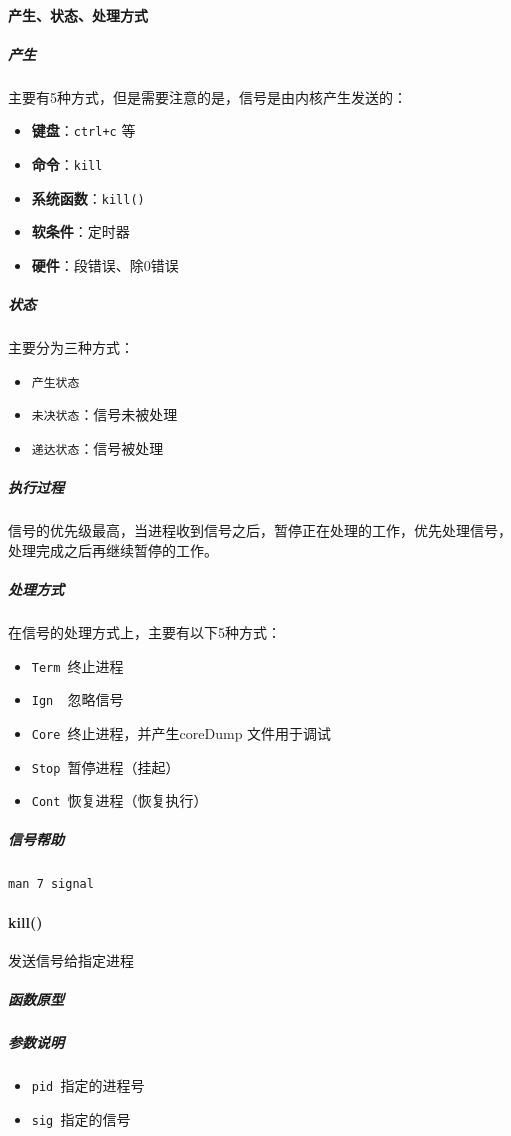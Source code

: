 \documentclass[UTF8,a4paper,12pt]{ctexbook}
\begin{document}
		\paragraph{产生、状态、处理方式}
			\subparagraph{产生}
				主要有5种方式，但是需要注意的是，信号是由内核产生发送的：
				\begin{itemize}[itemindent = 1em]
					\item \textbf{键盘}：\verb|ctrl+c| 等
					\item \textbf{命令}：\verb|kill|
					\item \textbf{系统函数}：\verb|kill()|
					\item \textbf{软条件}：定时器
					\item \textbf{硬件}：段错误、除0错误
				\end{itemize}
			\subparagraph{状态}
				主要分为三种方式：
				\begin{itemize}[itemindent = 1em]
					\item \verb|产生状态|
					\item \verb|未决状态|：信号未被处理
					\item \verb|递达状态|：信号被处理
				\end{itemize}
				
			\subparagraph{执行过程} 
				信号的优先级最高，当进程收到信号之后，暂停正在处理的工作，优先处理信号，处理完成之后再继续暂停的工作。	
		
			\subparagraph{处理方式}
				在信号的处理方式上，主要有以下5种方式：
				\begin{itemize}[itemindent = 1em]
					\item \verb|Term |终止进程
					\item \verb|Ign  |忽略信号
					\item \verb|Core |终止进程，并产生coreDump 文件用于调试
					\item \verb|Stop |暂停进程（挂起）
					\item \verb|Cont |恢复进程（恢复执行）
				\end{itemize}
			
			\subparagraph{信号帮助}
				\verb|man 7 signal|	
		
		\paragraph{kill()}发送信号给指定进程
			\subparagraph{函数原型}	
			
			\subparagraph{参数说明}
				\begin{itemize}[itemindent =1em]
					\item \verb|pid |指定的进程号  
					\item \verb|sig |指定的信号
				\end{itemize}
			
\end{document}
